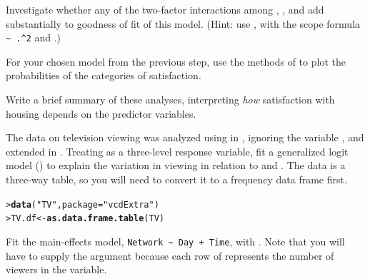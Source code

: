 \documentclass[10pt]{report}\usepackage[]{graphicx}\usepackage[]{color}
\makeatletter
\newcommand{\hlstr}[1]{\textcolor[rgb]{0.192,0.494,0.8}{#1}}%
\newcommand{\hlstd}[1]{\textcolor[rgb]{0.345,0.345,0.345}{#1}}%
\newcommand{\hlkwb}[1]{\textcolor[rgb]{0.69,0.353,0.396}{#1}}%
\newcommand{\hlkwc}[1]{\textcolor[rgb]{0.333,0.667,0.333}{#1}}%
\newcommand{\hlkwd}[1]{\textcolor[rgb]{0.737,0.353,0.396}{\textbf{#1}}}%
\newenvironment{kframe}{%
 \def\at@end@of@kframe{}%
 \ifinner\ifhmode%
  \def\at@end@of@kframe{\end{minipage}}%
  \begin{minipage}{\columnwidth}%
 \fi\fi%
 \def\FrameCommand##1{\hskip\@totalleftmargin \hskip-\fboxsep
 \colorbox{shadecolor}{##1}\hskip-\fboxsep
     \hskip-\linewidth \hskip-\@totalleftmargin \hskip\columnwidth}%
 \MakeFramed {\advance\hsize-\width
   \@totalleftmargin\z@ \linewidth\hsize
   \@setminipage}}%
 {\par\unskip\endMakeFramed%
 \at@end@of@kframe}
\newenvironment{knitrout}{}{} %
\renewenvironment{knitrout}{\small\renewcommand{\baselinestretch}{.85}}{} %
\makeatother
\begin{document}
\begin{Exercises}
\begin{enumerate*}
    \item Investigate whether any of the two-factor interactions among ,
    , and  add substantially to goodness of fit of this model.
    (Hint: use , with the scope formula \verb|~ .^2| and .)
    \begin{ans}
    \end{ans}
    
    \item For your chosen model from the previous step, use the methods of
     to plot the probabilities of the categories of
    satisfaction.
    \begin{ans}
    \end{ans}
    
    \item Write a brief summary of these analyses, interpreting \emph{how} satisfaction
    with housing depends on the predictor variables.
    \begin{ans}
    \end{ans}
    
  \end{enumerate*}

\exercise The data  on television viewing was analyzed using \ca in , ignoring the variable
  , and extended in .  Treating  as a three-level response variable,
  fit a generalized logit model () to  explain the variation in viewing in relation to  and .
  The  data is a three-way table, so you will need to convert it to a frequency data frame first.
\begin{knitrout}\footnotesize
{}\color{fgcolor}\begin{kframe}
\begin{alltt}
\hlstd{> }\hlkwd{data}\hlstd{(}\hlstr{"TV"}\hlstd{,} \hlkwc{package}\hlstd{=}\hlstr{"vcdExtra"}\hlstd{)}
\hlstd{> }\hlstd{TV.df} \hlkwb{<-} \hlkwd{as.data.frame.table}\hlstd{(TV)}
\end{alltt}
\end{kframe}
\end{knitrout}
  \begin{enumerate*}
    \item Fit the main-effects model, \verb|Network ~ Day + Time|, with .  Note that you will have to
    supply the  argument because each row of  represents the number of viewers in the
     variable.
    \begin{ans}
    \end{ans}
    

\end{enumerate*}
\end{Exercises}
\end{document}

